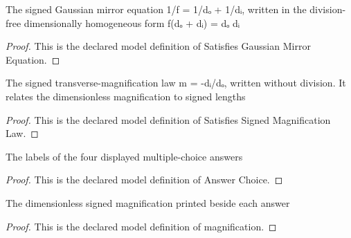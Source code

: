 \begin{definition}
  \label{def:physics:phyx-mini-0140:phyxminiproblems-problemphyxmini0140-satisfiesgaussianmirrorequation}
  The signed Gaussian mirror equation 1/f = 1/dₒ + 1/dᵢ, written in the division-free dimensionally homogeneous form f(dₒ + dᵢ) = dₒ dᵢ
\end{definition}
\begin{proof}
  This is the declared model definition of Satisfies Gaussian Mirror Equation.
\end{proof}
\begin{definition}
  \label{def:physics:phyx-mini-0140:phyxminiproblems-problemphyxmini0140-satisfiessignedmagnificationlaw}
  The signed transverse-magnification law m = -dᵢ/dₒ, written without division. It relates the dimensionless magnification to signed lengths
\end{definition}
\begin{proof}
  This is the declared model definition of Satisfies Signed Magnification Law.
\end{proof}
\begin{definition}
  \label{def:physics:phyx-mini-0140:phyxminiproblems-problemphyxmini0140-answerchoice}
  The labels of the four displayed multiple-choice answers
\end{definition}
\begin{proof}
  This is the declared model definition of Answer Choice.
\end{proof}
\begin{definition}[magnification]
  \label{def:physics:phyx-mini-0140:phyxminiproblems-problemphyxmini0140-answerchoice-magnification}
  The dimensionless signed magnification printed beside each answer
\end{definition}
\begin{proof}
  This is the declared model definition of magnification.
\end{proof}
